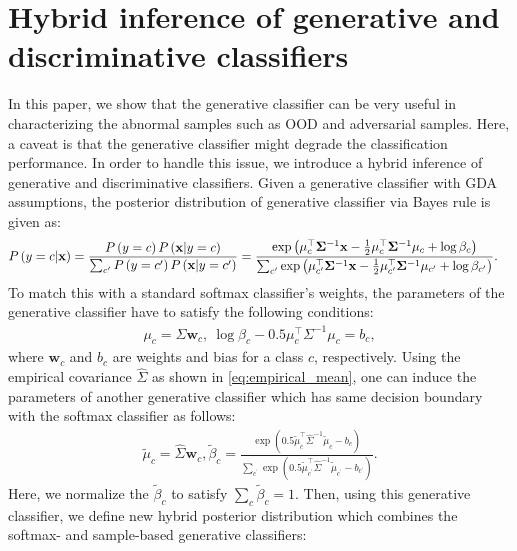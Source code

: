 \documentclass{article}
\begin{document}
\section{Hybrid inference of generative and discriminative classifiers}

In this paper, we show that the generative classifier can be very useful in characterizing the abnormal samples such as OOD and adversarial samples.
Here, a caveat is that the generative classifier might degrade the classification performance.
In order to handle this issue, 
we introduce a hybrid inference of generative and discriminative classifiers.
Given a generative classifier with GDA assumptions, 
the posterior distribution of generative classifier via Bayes rule is given as:
\begin{align*} & P\left(y=c|\mathbf{x}\right) = \frac{P\left( y = c \right) P\left(\mathbf{x}| y =c \right) }{\sum_{c^\prime}P\left( y= c^\prime \right) P\left(\mathbf{x}| y= c^\prime \right)} \notag = \frac{ \exp \left( \mathbf{\mu}_c^\top \mathbf{\Sigma}^{-1} \mathbf{x} -\frac{1}{2} \mathbf{\mu}_c^\top \mathbf{\Sigma}^{-1} \mathbf{\mu}_c +\log \beta_c \right) }{\sum_{c^\prime} \exp \left( \mathbf{\mu}_{c^\prime}^\top \mathbf{\Sigma}^{-1} \mathbf{x} -\frac{1}{2} \mathbf{\mu}_{c^\prime}^\top \mathbf{\Sigma}^{-1} \mathbf{\mu}_{c^\prime} +\log \beta_{c^\prime} \right)}.
\end{align*}
To match this with a standard softmax classifier's weights,
the parameters of the generative classifier have to satisfy the following conditions:
\begin{align*}
    \mu_c = \Sigma \mathbf{w}_c, ~\log \beta_c - 0.5 \mu_c^\top \Sigma^{-1}\mu_c = b_c,
\end{align*}
where $\mathbf{w}_c$ and $b_c$ are weights and bias for a class $c$, respectively. 
Using the empirical covariance ${\widehat \Sigma}$ as shown in \eqref{eq:empirical_mean},
one can induce the parameters of another generative classifier which has same decision boundary with the softmax classifier as follows:
\begin{align*}
    {\tilde \mu}_c = {\widehat \Sigma} \mathbf{w}_c,
    {\tilde \beta}_c  = \frac{\exp( 0.5 {\tilde \mu}_c^\top {\widehat \Sigma}^{-1}{\tilde \mu}_c - b_c )}{\sum_{c^\prime}\exp( 0.5 {\tilde \mu}_{c^\prime}^\top {\widehat \Sigma}^{-1}{\tilde \mu}_{c^\prime} - b_{c^\prime} )}.
\end{align*}
Here, we normalize the ${\tilde \beta}_c$ to satisfy $\sum_c {\tilde \beta}_c = 1$. 
Then, using this generative classifier, 
we define new hybrid posterior distribution which combines the softmax- and sample-based generative classifiers:
\end{document}
